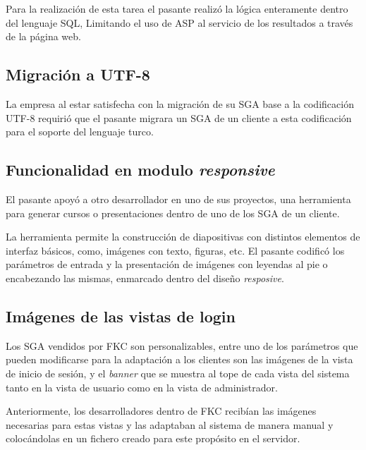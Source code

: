 	Para la realización de esta tarea el pasante realizó la lógica enteramente dentro del lenguaje \gls{SQL}, Limitando el uso de \gls{ASP} al servicio de los resultados a través de la página web.


	\subsection{Migración a UTF-8} %
	\label{sub:migracion_a_utf_8}
	
	La empresa al estar satisfecha con la migración de su \gls{SGA} base a la codificación \gls{UTF-8} requirió que el pasante migrara un \gls{SGA} de un cliente a esta codificación para el soporte del lenguaje turco.

	\subsection{Funcionalidad en modulo \emph{responsive}} %
	\label{sub:funcionalidad_en_modulo_responsive}
	
	El pasante apoyó a otro desarrollador en uno de sus proyectos, una herramienta para generar cursos o presentaciones dentro de uno de los \gls{SGA} de un cliente.

	La herramienta permite la construcción de diapositivas con distintos elementos de interfaz básicos, como, imágenes con texto, figuras, etc. El pasante codificó los parámetros de entrada y la presentación de imágenes con leyendas al pie o encabezando las mismas, enmarcado dentro del diseño \emph{resposive}.


	\subsection{Imágenes de las vistas de login} %
	\label{sub:imagenes_de_las_vistas_de_login}
	
	Los \gls{SGA} vendidos por \gls{FKC} son personalizables, entre uno de los parámetros que pueden modificarse para la adaptación a los clientes son las imágenes de la vista de inicio de sesión, y el \emph{banner} que se muestra al tope de cada vista del sistema tanto en la vista de usuario como en la vista de administrador.

	Anteriormente, los desarrolladores dentro de \gls{FKC} recibían las imágenes necesarias para estas vistas y las adaptaban al sistema de manera manual y colocándolas en un fichero creado para este propósito en el servidor.

